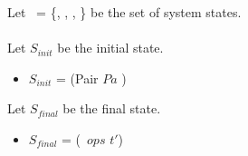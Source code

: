\documentclass[runningheads]{llncs}
\begin{document}
Let \SYSTEM\ = \{\STATEONE, \STATETWO, \DOT, \STATEN \} be the set of system states.
\\
\\
Let $S_{init}$  be the initial state. 

\begin{itemize}
\item[]  $S_{init}$ = (Pair $Pa$ \Term) \STACKCONCAT\ \EMPTYSTACK
\end{itemize}


\noindent Let $S_{final}$  be the final state. 

\begin{itemize}
\item[]  $S_{final}$ = (\PAIR\ $ops$ $t'$) \STACKCONCAT\ \EMPTYSTACK
\end{itemize}




\pagebreak
\end{document}
